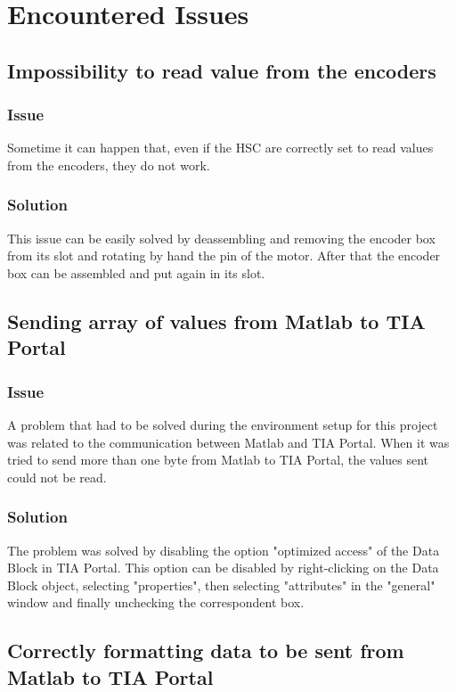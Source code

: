 \chapter{Encountered Issues}

\section{Impossibility to read value from the encoders}
\subsection{Issue}
Sometime it can happen that, even if the HSC are correctly set to read values from the encoders, they do not work.
\subsection{Solution}
This issue can be easily solved by deassembling and removing the encoder box from its slot and rotating by hand the pin of the motor. After that the encoder box can be assembled and put again in its slot.

\section{Sending array of values from Matlab to TIA Portal}
\subsection{Issue}
A problem that had to be solved during the environment setup for this project was related to the communication between Matlab and TIA Portal. When it was tried to send more than one byte from Matlab to TIA Portal, the values sent could not be read.

\subsection{Solution}
The problem was solved \cite{TIAPorta92:online} by disabling the option "optimized access" of the Data Block in TIA Portal. This option can be disabled by right-clicking on the Data Block object, selecting "properties", then selecting "attributes" in the "general" window and finally unchecking the correspondent box.

\section{Correctly formatting data to be sent from Matlab to TIA Portal}

